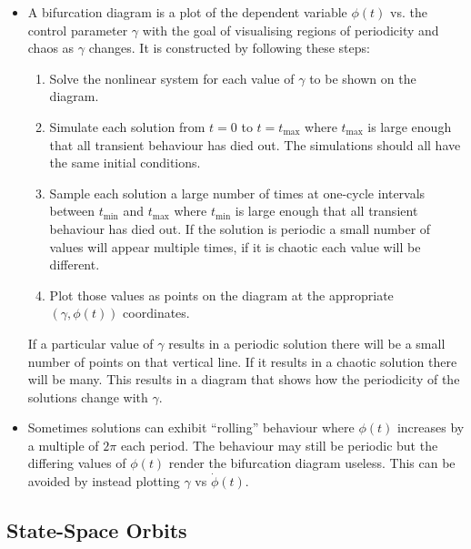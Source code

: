 \documentclass{article}
\begin{document}
\begin{itemize}
  \item A bifurcation diagram is a plot of the dependent variable $\phi(t)$ vs. the control parameter $\gamma$ with the goal of visualising regions of periodicity and chaos as $\gamma$ changes. It is constructed by following these steps:

        \begin{enumerate}
          \item Solve the nonlinear system for each value of $\gamma$ to be shown on the diagram.

          \item Simulate each solution from $t = 0$ to $t = t_\text{max}$ where $t_\text{max}$ is large enough that all transient behaviour has died out. The simulations should all have the same initial conditions.

          \item Sample each solution a large number of times at one-cycle intervals between $t_\text{min}$ and $t_\text{max}$ where $t_\text{min}$ is large enough that all transient behaviour has died out. If the solution is periodic a small number of values will appear multiple times, if it is chaotic each value will be different.

          \item Plot those values as points on the diagram at the appropriate $(\gamma, \phi(t))$ coordinates.
        \end{enumerate}

        If a particular value of $\gamma$ results in a periodic solution there will be a small number of points on that vertical line. If it results in a chaotic solution there will be many. This results in a diagram that shows how the periodicity of the solutions change with $\gamma$.

  \item Sometimes solutions can exhibit ``rolling'' behaviour where $\phi(t)$ increases by a multiple of $2 \pi$ each period. The behaviour may still be periodic but the differing values of $\phi(t)$ render the bifurcation diagram useless. This can be avoided by instead plotting $\gamma$ vs $\dot{\phi}(t)$.
\end{itemize}

\subsection{State-Space Orbits}
\end{document}
